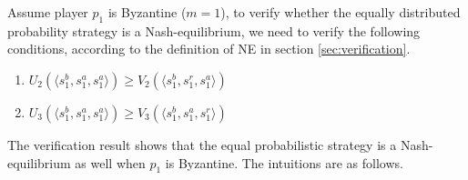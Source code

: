 Assume player $p_1$ is Byzantine ($m=1$), to verify whether the equally distributed probability strategy is a Nash-equilibrium, we need to 
verify the following conditions, according to the definition of NE in section \ref{sec:verification}.
\begin{enumerate}
\item
$U_2(\langle s_1^b,s_1^a,s_1^a \rangle ) \geq V_2(\langle s_1^b,s_1^r,s_1^a  \rangle )$
\item
$U_3(\langle s_1^b,s_1^a,s_1^a  \rangle ) \geq V_3(\langle s_1^b,s_1^a,s_1^r  \rangle )$
\end{enumerate}
The verification result shows that the equal probabilistic strategy is a Nash-equilibrium as well when $p_1$ is Byzantine. The intuitions are as follows.

 
